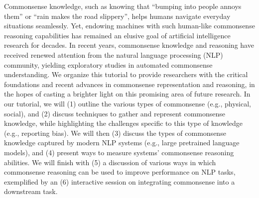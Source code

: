 Commonsense knowledge, such as knowing that ``bumping into people annoys them'' or ``rain makes the road slippery'', helps humans navigate everyday situations seamlessly. Yet, endowing machines with such human-like commonsense reasoning capabilities has remained an elusive goal of artificial intelligence research for decades. In recent years, commonsense knowledge and reasoning have received renewed attention from the natural language processing (NLP) community, yielding exploratory studies in automated commonsense understanding. We organize this tutorial to provide researchers with the critical foundations and recent advances in commonsense representation and reasoning, in the hopes of casting a brighter light on this promising area of future research. In our tutorial, we will (1) outline the various types of commonsense (e.g., physical, social), and (2) discuss techniques to gather and represent commonsense knowledge, while highlighting the challenges specific to this type of knowledge (e.g., reporting bias). We will then (3) discuss the types of commonsense knowledge captured by modern NLP systems (e.g., large pretrained language models), and (4) present ways to measure systems' commonsense reasoning abilities. We will finish with (5) a discussion of various ways in which commonsense reasoning can be used to improve performance on NLP tasks, exemplified by an (6) interactive session on integrating commonsense into a downstream task.
